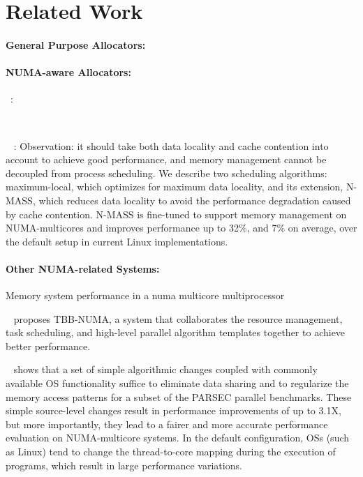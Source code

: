 \section{Related Work}

\paragraph{General Purpose Allocators:}

\paragraph{NUMA-aware Allocators:} 

~\cite{Ogasawara:2009:NMM:1640089.1640117}:


~\cite{1419934}
~\cite{tcmallocnew}

~\cite{Majo:2011:MMN:1993478.1993481} :
Observation: it should take both data locality and cache contention into account to achieve good performance, and memory management cannot be decoupled from process scheduling. 
We describe two scheduling algorithms: maximum-local, which optimizes for maximum data locality, and its extension, N-MASS, which reduces data locality to avoid the performance degradation caused by cache contention. N-MASS is fine-tuned to support memory management on NUMA-multicores and improves performance up to 32\%, and 7\% on average, over the default setup in current Linux implementations.


\paragraph{Other NUMA-related Systems:} 

Memory system performance in a numa multicore multiprocessor

~\cite{Majo:2015:LPC:2688500.2688509} proposes TBB-NUMA, a system that collaborates the resource management, task scheduling, and high-level parallel algorithm templates together  to achieve better performance. 

~\cite{6704666} shows that a set of simple algorithmic changes coupled with commonly available OS functionality suffice to eliminate data sharing and to regularize the memory access patterns for a subset of the PARSEC parallel benchmarks. These simple source-level changes result in performance improvements of up to 3.1X, but more importantly, they lead to a fairer and more accurate performance evaluation on NUMA-multicore systems. In the default
configuration, OSs (such as Linux) tend to change the thread-to-core mapping during the execution of programs, which result in large performance variations.

